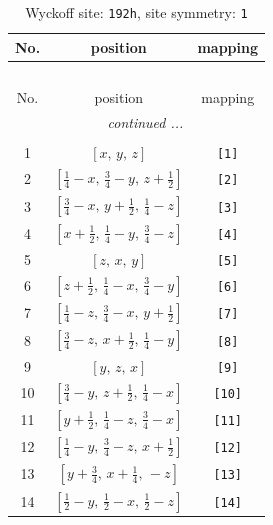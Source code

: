 \documentclass[fleqn,8pt]{jsarticle}
\begin{document}
\begin{longtable}{ccc}
\caption{Wyckoff site: {\tt 192h}, site symmetry: {\tt 1}}
 \\
 \hline \hline
No. & position & mapping \\ \hline \endfirsthead

\multicolumn{2}{l}{\tablename\ \thetable{}} \\
 \hline \hline
No. & position & mapping \\ \hline \endhead

 \hline \hline
\multicolumn{2}{r}{\footnotesize\it continued ...} \\ \endfoot

 \hline \hline
\multicolumn{2}{r}{} \\ \endlastfoot

1 & $\left[ x,\, y,\, z \right]$ & {\tt [1]} \\ \hline
2 & $\left[ \frac{1}{4} - x,\, \frac{3}{4} - y,\, z + \frac{1}{2} \right]$ & {\tt [2]} \\ \hline
3 & $\left[ \frac{3}{4} - x,\, y + \frac{1}{2},\, \frac{1}{4} - z \right]$ & {\tt [3]} \\ \hline
4 & $\left[ x + \frac{1}{2},\, \frac{1}{4} - y,\, \frac{3}{4} - z \right]$ & {\tt [4]} \\ \hline
5 & $\left[ z,\, x,\, y \right]$ & {\tt [5]} \\ \hline
6 & $\left[ z + \frac{1}{2},\, \frac{1}{4} - x,\, \frac{3}{4} - y \right]$ & {\tt [6]} \\ \hline
7 & $\left[ \frac{1}{4} - z,\, \frac{3}{4} - x,\, y + \frac{1}{2} \right]$ & {\tt [7]} \\ \hline
8 & $\left[ \frac{3}{4} - z,\, x + \frac{1}{2},\, \frac{1}{4} - y \right]$ & {\tt [8]} \\ \hline
9 & $\left[ y,\, z,\, x \right]$ & {\tt [9]} \\ \hline
10 & $\left[ \frac{3}{4} - y,\, z + \frac{1}{2},\, \frac{1}{4} - x \right]$ & {\tt [10]} \\ \hline
11 & $\left[ y + \frac{1}{2},\, \frac{1}{4} - z,\, \frac{3}{4} - x \right]$ & {\tt [11]} \\ \hline
12 & $\left[ \frac{1}{4} - y,\, \frac{3}{4} - z,\, x + \frac{1}{2} \right]$ & {\tt [12]} \\ \hline
13 & $\left[ y + \frac{3}{4},\, x + \frac{1}{4},\, - z \right]$ & {\tt [13]} \\ \hline
14 & $\left[ \frac{1}{2} - y,\, \frac{1}{2} - x,\, \frac{1}{2} - z \right]$ & {\tt [14]} \\ \hline

\end{longtable}
\end{document}

